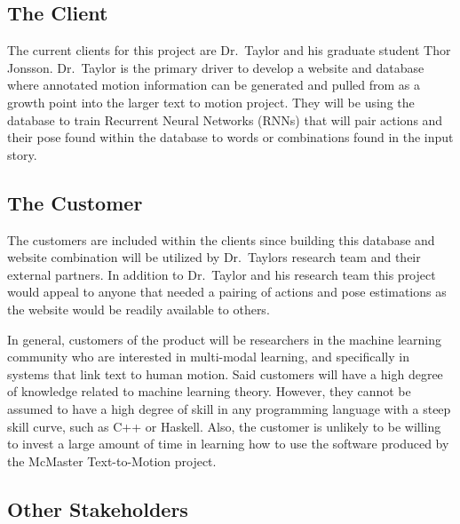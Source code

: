 \documentclass{scrreprt}
\begin{document}
\subsection{The Client}

The current clients for this project are Dr.\ Taylor and his graduate student
Thor Jonsson. Dr.\ Taylor is the primary driver to develop a website and
database where annotated motion information can be generated and pulled from as
a growth point into the larger text to motion project. They will be using the
database to train %
Recurrent Neural Networks (RNNs) that will pair actions and
their pose found within the database to words or combinations found in the
input story.

\subsection{The Customer}

The customers are included within the clients since building this database and
website combination will be utilized by Dr.\ Taylors research team and their
external partners. In addition to Dr.\ Taylor and his research team this project
would appeal to anyone that needed a pairing of actions and pose estimations as
the website would be readily available to others.

In general, customers of the product will be researchers in the machine
learning community who are interested in multi-modal learning, and specifically
in systems that link text to human motion. Said customers will have a high
degree of knowledge related to machine learning theory. However, they cannot be
assumed to have a high degree of skill in any programming language with a steep
skill curve, such as C++ or Haskell. %
Also, the customer is unlikely to be
willing to invest a large amount of time in learning how to use the software
produced by the McMaster Text-to-Motion project.

\subsection{Other Stakeholders}
\end{document}
